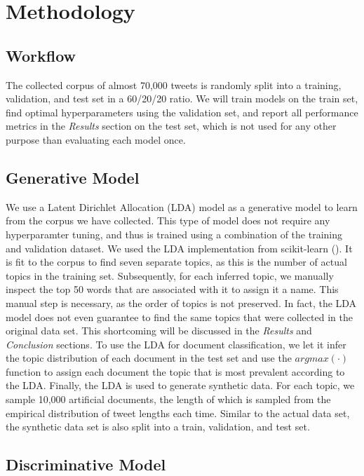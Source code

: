 \documentclass[11pt]{article}
\begin{document}
\section{Methodology}
\subsection{Workflow}
The collected corpus of almost 70,000 tweets is randomly split into a training, validation, and test set in a 60/20/20 ratio. We will train models on the train set, find optimal hyperparameters using the validation set, and report all performance metrics in the \emph{Results} section on the test set, which is not used for any other purpose than evaluating each model once. 


\subsection{Generative Model}
We use a Latent Dirichlet Allocation (LDA) model as a generative model to learn from the corpus we have collected. This type of model does not require any hyperparamter tuning, and thus is trained using a combination of the training and validation dataset. We used the LDA implementation from scikit-learn (\cite{sklearn}). It is fit to the corpus to find seven separate topics, as this is the number of actual topics in the training set. Subsequently, for each inferred topic, we manually inspect the top 50 words that are associated with it to assign it a name. This manual step is necessary, as the order of topics is not preserved. In fact, the LDA model does not even guarantee to find the same topics that were collected in the original data set. This shortcoming will be discussed in the \emph{Results} and \emph{Conclusion} sections. 
To use the LDA for document classification,  we let it infer the topic distribution of each document in the test set and use the $argmax(\cdot)$ function to assign each document the topic that is most prevalent according to the LDA.
Finally, the LDA is used to generate synthetic data. For each topic, we sample 10,000 artificial documents, the length of which is sampled from the empirical distribution of tweet lengths each time. Similar to the actual data set, the synthetic data set is also split into a train, validation, and test set.


\subsection{Discriminative Model}
\end{document}
